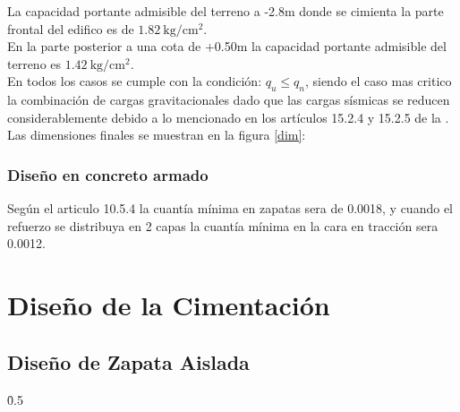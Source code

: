 \documentclass{article}%
\begin{document}
\noindent
La capacidad portante admisible del terreno a -2.8m donde se cimienta la parte frontal del edifico es de $1.82\mathrm{~kg/cm^2} $.\\
En la parte posterior a una cota de +0.50m la capacidad portante admisible del terreno es $1.42\mathrm{~kg/cm^2}$.\\
En todos los casos se cumple con la condición: $q_{u}\leq q_{n}$, siendo el caso mas critico la combinación de cargas gravitacionales dado que las cargas sísmicas se reducen considerablemente debido a lo mencionado en los artículos 15.2.4 y 15.2.5 de la \cite{E-060}.\\
Las dimensiones finales se muestran en la figura \ref{dim}:

\newpage
\subsubsection{Diseño en concreto armado}
\noindent 
Según el articulo 10.5.4 la cuantía mínima en zapatas sera de 0.0018, y cuando el refuerzo se distribuya en 2 capas la cuantía mínima en la cara en tracción sera 0.0012.\\



\newpage
\section{Diseño de la Cimentación}

\subsection{Diseño de Zapata Aislada}

\FPset{} %
\FPset{}
\FPset{}
\FPset{}
\FPset{}
\FPset\h{0.5}
\end{document}
